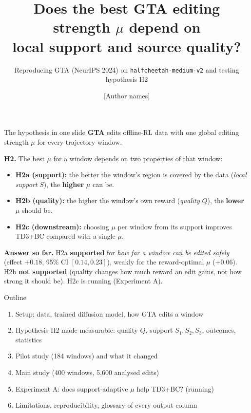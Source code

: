 \documentclass[aspectratio=169,11pt]{beamer}
\title{Does the best GTA editing strength $\mu$ depend on\\ local support and source quality?}
\subtitle{Reproducing GTA (NeurIPS 2024) on \texttt{halfcheetah-medium-v2} and testing hypothesis H2}
\author{[Author names]}
\date{}
\newcommand{\hyp}[1]{\textcolor{acc}{\textbf{#1}}}
\newcommand{\yes}{\textcolor{ok}{\textbf{supported}}}
\newcommand{\nope}{\textcolor{no}{\textbf{not supported}}}
\begin{document}
\begin{frame}
\titlepage
\end{frame}

\begin{frame}{The hypothesis in one slide}
\textbf{GTA} edits offline-RL data with one global editing strength $\mu$ for every trajectory window.
\vspace{0.6em}

\hyp{H2.} The best $\mu$ for a window depends on two properties of that window:
\begin{itemize}
\item \hyp{H2a (support):} the better the window's region is covered by the data (\emph{local support} $S$), the \textbf{higher} $\mu$ can be.
\item \hyp{H2b (quality):} the higher the window's own reward (\emph{quality} $Q$), the \textbf{lower} $\mu$ should be.
\item \hyp{H2c (downstream):} choosing $\mu$ per window from its support improves TD3+BC compared with a single $\mu$.
\end{itemize}
\vspace{0.6em}
\textbf{Answer so far.}
H2a \yes{} for \emph{how far a window can be edited safely} (effect $+0.18$, 95\% CI $[0.14,0.23]$), weakly for the reward-optimal $\mu$ ($+0.06$).
H2b \nope{} (quality changes how much reward an edit gains, not how strong it should be).
H2c is running (Experiment A).
\end{frame}

\begin{frame}{Outline}
\begin{enumerate}
\item Setup: data, trained diffusion model, how GTA edits a window
\item Hypothesis H2 made measurable: quality $Q$, support $S_1,S_2,S_3$, outcomes, statistics
\item Pilot study (184 windows) and what it changed
\item Main study (400 windows, 5{,}600 analysed edits)
\item Experiment A: does support-adaptive $\mu$ help TD3+BC? (running)
\item Limitations, reproducibility, glossary of every output column
\end{enumerate}
\end{frame}

\end{document}
